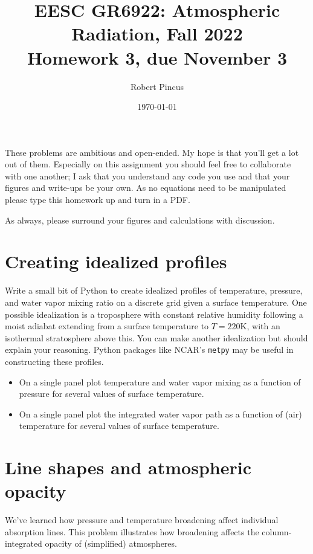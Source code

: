 \documentclass{article}
\title{EESC GR6922: Atmospheric Radiation, Fall 2022 \\  Homework 3, due November 3}
\author{Robert Pincus}
\date{\today}
\begin{document}
\maketitle
These problems are  ambitious and open-ended. My hope is that you'll get a lot out of them. Especially on this assignment you should feel free to collaborate with one another; I ask that you understand any code you use and that your figures and write-ups be your own. As no equations need to be manipulated please type this homework up and turn in a PDF. 

As always, please surround your figures and calculations with discussion. 

\section{Creating idealized profiles}

Write a small bit of Python to create idealized profiles of temperature, pressure, and water vapor mixing ratio on a discrete grid given a surface temperature. One possible idealization is a troposphere with constant relative humidity following a moist adiabat extending from a surface temperature to $T = 220 \si{\kelvin}$, with an isothermal stratosphere above this. You can make another idealization but should explain your reasoning. Python packages like NCAR's {\tt metpy} may be useful in constructing these profiles. 

\begin{itemize}
\item On a single panel plot temperature and water vapor mixing as a function of pressure for several values of surface temperature. 
\item On a single panel plot the integrated water vapor path as a function of (air) temperature for several values of surface temperature. 
\end{itemize}

\section{Line shapes and atmospheric opacity}

We've learned how pressure and temperature broadening affect individual absorption lines. This problem illustrates how broadening affects the column-integrated opacity of (simplified) atmospheres. 
\end{document}
